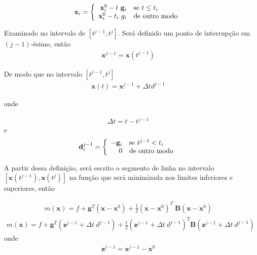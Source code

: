        
          \begin{eqnarray} 
          \nonumber
          \mathbf{x}_{i}  = \left\{ \begin{array}{rll}
          {\mathbf{x}_{i}^{0}-t~\mathbf{g}_{i}}  & {\hbox{se}~ t \le t_{i}} \\
           {\mathbf{x}_{i}^{0}- t_{i}~g_{i}}     & {\hbox{de outro modo}}
          \end{array} \right.
          \label{ddd}
          \end{eqnarray}
          
          
          Examinado no intervalo de $\left [t^{j-1},t^{j}\right]$. Será definido um ponto de interrupção em $(j-1)$-ésimo, então
          \begin{eqnarray}
           \mathbf{x}^{j-1} = \mathbf{x}\left(t^{j-1}\right)
          \end{eqnarray}

          De modo que no intervalo $\left [ t^{j-1}, t^{j}\right ]$
          \begin{eqnarray}
          \mathbf{x}(t) = \mathbf{x}^{j-1} + \Delta t d^{j-1} 
          \end{eqnarray}
          
          onde 
          
          \begin{eqnarray}
          \nonumber
          \Delta t = t-t^{j-1}
          \end{eqnarray}
          e
          \begin{eqnarray} 
          \mathbf{d}_{i}^{j-1}  = \left\{ \begin{array}{rll}
          {-\mathbf{g}_{i}}  & {\hbox{se}~ t^{j-1} < t_{i}} \\
           {0}     & {\hbox{de outro modo}}
          \end{array} \right.
          \label{dij}
          \end{eqnarray}
          
  
          A partir dessa definição, será escrito o segmento de linha no intervalo $\left [ \mathbf{x}\left(t^{j-1}\right),\mathbf{x}\left(t^{j}\right) \right] $ na função que será minimizada nos limites inferiores e superiores, então
          
          \begin{eqnarray}
          \nonumber
           m(\mathbf{x}) = f + \mathbf{g}^{T}(\mathbf{x}-\mathbf{x}^{0}) + \frac{1}{2}(\mathbf{x}-\mathbf{x}^{0})^{T}~\mathbf{B}(\mathbf{x}-\mathbf{x}^{0})
          \end{eqnarray}
          \begin{eqnarray}
          m(\mathbf{x}) = f+ \mathbf{g}^{T}(\mathbf{z}^{j-1} + \Delta t~d^{j-1}) + \frac{1}{2} (\mathbf{z}^{j-1}+ \Delta t~d^{j-1})^{T} \mathbf{B} (\mathbf{z}^{j-1} +\Delta t~d^{j-1})
          \label{mksegx}
          \end{eqnarray}
          onde
          \vspace{-0.25cm}
          \begin{eqnarray}
          \mathbf{z}^{j-1}= \mathbf{x}^{j-1} - \mathbf{x}^{0}
          \label{zzz}
          \end{eqnarray}

